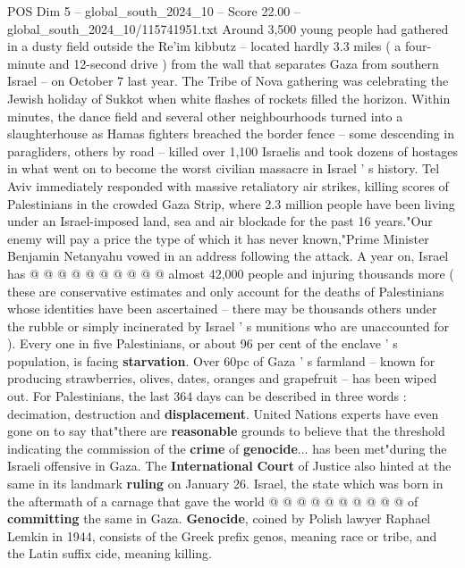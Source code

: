 \begin{textsample}{POS Dim 5 – global\_south\_2024\_10 – Score 22.00 – global\_south\_2024\_10/115741951.txt}  \label{ex:f5_pos_341}
Around 3,500 young people had gathered in a dusty field outside the Re'im kibbutz -- located hardly 3.3 miles ( a four-minute and 12-second drive ) from the wall that separates Gaza from southern Israel -- on October 7 last year.
The Tribe of Nova gathering was celebrating the Jewish holiday of Sukkot when white flashes of rockets filled the horizon.
Within minutes, the dance field and several other neighbourhoods turned into a slaughterhouse as Hamas fighters breached the border fence -- some descending in paragliders, others by road -- killed over 1,100 Israelis and took dozens of hostages in what went on to become the worst civilian massacre in Israel ' s history.
Tel Aviv immediately responded with massive retaliatory air strikes, killing scores of Palestinians in the crowded Gaza Strip, where 2.3 million people have been living under an Israel-imposed land, sea and air blockade for the past 16 years."Our enemy will pay a price the type of which it has never known,"Prime Minister Benjamin Netanyahu vowed in an address following the attack.
A year on, Israel has @ @ @ @ @ @ @ @ @ @ almost 42,000 people and injuring thousands more ( these are conservative estimates and only account for the deaths of Palestinians whose identities have been ascertained -- there may be thousands others under the rubble or simply incinerated by Israel ' s munitions who are unaccounted for ).
Every one in five Palestinians, or about 96 per cent of the enclave ' s population, is facing \textbf{starvation}.
Over 60pc of Gaza ' s farmland -- known for producing strawberries, olives, dates, oranges and grapefruit -- has been wiped out.
For Palestinians, the last 364 days can be described in three words : decimation, destruction and \textbf{displacement}.
United Nations experts have even gone on to say that"there are \textbf{reasonable} grounds to believe that the threshold indicating the commission of the \textbf{crime} of \textbf{genocide}... has been met"during the Israeli offensive in Gaza.
The \textbf{International} \textbf{Court} of Justice also hinted at the same in its landmark \textbf{ruling} on January 26.
Israel, the state which was born in the aftermath of a carnage that gave the world @ @ @ @ @ @ @ @ @ @ of \textbf{committing} the same in Gaza. \textbf{Genocide}, coined by Polish lawyer Raphael Lemkin in 1944, consists of the Greek prefix genos, meaning race or tribe, and the Latin suffix cide, meaning killing.

\end{textsample}
